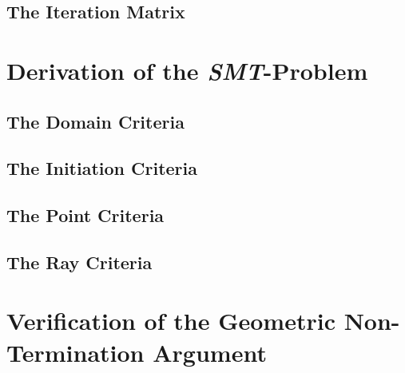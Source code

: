 \subsection{The Iteration Matrix}

\section{Derivation of the \emph{SMT}-Problem}

\subsection{The Domain Criteria}

\subsection{The Initiation Criteria}

\subsection{The Point Criteria}

\subsection{The Ray Criteria}

\section{Verification of the Geometric Non-Termination Argument}
	 
